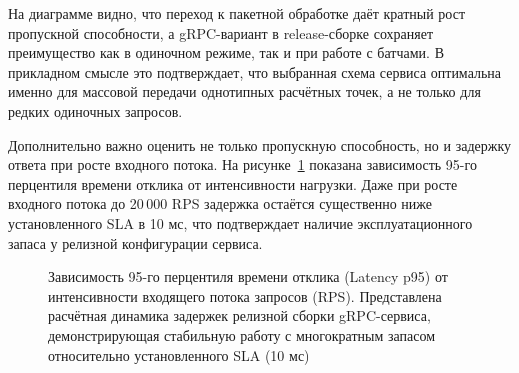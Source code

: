 На диаграмме видно,
что переход к пакетной обработке даёт кратный рост пропускной способности,
а gRPC-вариант в release-сборке сохраняет преимущество как в одиночном режиме,
так и при работе с батчами.
В прикладном смысле это подтверждает,
что выбранная схема сервиса оптимальна именно для массовой передачи
однотипных расчётных точек,
а не только для редких одиночных запросов.

Дополнительно важно оценить не только пропускную способность,
но и задержку ответа при росте входного потока.
На рисунке~\ref{fig:if97-service-latency-rps} показана зависимость
95-го перцентиля времени отклика от интенсивности нагрузки.
Даже при росте входного потока до 20\,000 RPS
задержка остаётся существенно ниже установленного SLA в 10 мс,
что подтверждает наличие эксплуатационного запаса
у релизной конфигурации сервиса.

\begin{figure}[htbp]
    \centering
    \caption{Зависимость 95-го перцентиля времени отклика (Latency p95) от интенсивности входящего потока запросов (RPS). Представлена расчётная динамика задержек релизной сборки gRPC-сервиса, демонстрирующая стабильную работу с многократным запасом относительно установленного SLA (10 мс)}
    \label{fig:if97-service-latency-rps}
\end{figure}


